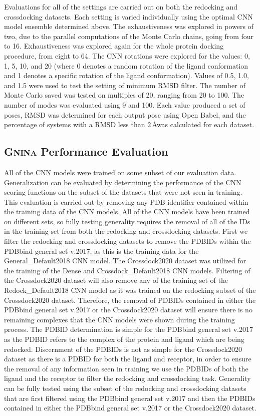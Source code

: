 \documentclass[journal=jcisd8,manuscript=article]{achemso}
\begin{document}
Evaluations for all of the settings are carried out on both the redocking and crossdocking datasets. Each setting is varied individually using the optimal CNN model ensemble determined above. The exhaustiveness was explored in powers of two, due to the parallel computations of the Monte Carlo chains, going from four to 16. Exhaustiveness was explored again for the whole protein docking procedure, from eight to 64. The CNN rotations were explored for the values: 0, 1, 5, 10, and 20 (where 0 denotes a random rotation of the ligand conformation and 1 denotes a specific rotation of the ligand conformation). Values of 0.5, 1.0, and 1.5 were used to test the setting of minimum RMSD filter. The number of Monte Carlo saved was tested on multiples of 20, ranging from 20 to 100. The number of modes was evaluated using 9 and 100. Each value produced a set of poses, RMSD was determined for each output pose using Open Babel, and the percentage of systems with a RMSD less than $2\,$\AA was calculated for each dataset.

\subsection{\textsc{Gnina} Performance Evaluation}
All of the CNN models were trained on some subset of our evaluation data. Generalization can be evaluated by determining the performance of the CNN scoring functions on the subset of the datasets that were not seen in training. This evaluation is carried out by removing any PDB identifier contained within the training data of the CNN models. All of the CNN models have been trained on  different sets, so fully testing generality requires the removal of all of the IDs in the training set from both the redocking and crossdocking datasets. First we filter the redocking and crossdocking datasets to remove the PDBIDs within the PDBbind general set v.2017, as this is the training data for the General\_Default2018 CNN model. The Crossdock2020 dataset was utilized for the training of the Dense and Crossdock\_Default2018 CNN models. Filtering of the Crossdock2020 dataset will also remove any of the training set of the Redock\_Default2018 CNN model as it was trained on the redocking subset of the Crossdock2020 dataset. Therefore, the removal of PDBIDs contained in either the PDBbind general set v.2017 or the Crossdock2020 dataset will ensure there is no remaining complexes that the CNN models were shown during the training process. The PDBID determination is simple for the PDBbind general set v.2017 as the PDBID refers to the complex of the protein and ligand which are being redocked. Discernment of the PDBIDs is not as simple for the Crossdock2020 dataset as there is a PDBID for both the ligand and receptor, in order to ensure the removal of any information seen in training we use the PDBIDs of both the ligand and the receptor to filter the redocking and crossdocking task. Generality can be fully tested using the subset of the redocking and crossdocking datasets that are first filtered using the PDBbind general set v.2017 and then the PDBIDs contained in either the PDBbind general set v.2017 or the Crossdock2020 dataset. 
\end{document}
